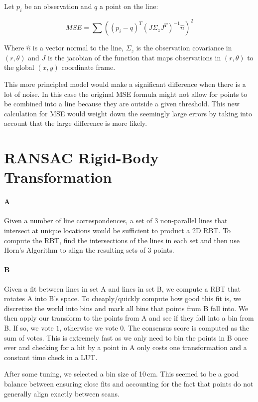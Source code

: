 \documentclass[12pt]{article}
\begin{document}
Let $p_i$ be an observation and $q$ a point on the line:

\[MSE = \sum{\left((p_i-q)^T\left(J\Sigma_zJ^T\right)^{-1}\hat{n}\right)^2} \]

Where $\hat{n}$ is a vector normal to the line, $\Sigma_z$ is the observation covariance in $(r,\theta)$ and $J$ is the jacobian of the function that maps observations in $(r,\theta)$ to the global $(x,y)$ coordinate frame.

This more principled model would make a significant difference when there is a lot of noise.  In this case the original MSE formula might not allow for points to be combined into a line because they are outside a given threshold.  This new calculation for MSE would weight down the seemingly large errors by taking into account that the large difference is more likely.
\section{RANSAC Rigid-Body Transformation}

\paragraph{A}
Given a number of line correspondences, a set of 3 non-parallel lines that
intersect at unique locations would be sufficient to product a 2D RBT. To
compute the RBT, find the intersections of the lines in each set and then
use Horn's Algorithm to align the resulting sets of 3 points.

\paragraph{B}
Given a fit between lines in set A and lines in set B, we compute a RBT that
rotates A into B's space. To cheaply/quickly compute how good this fit is,
we discretize the world into bins and mark all bins that points from B fall
into. We then apply our transform to the points from A and see if they fall
into a bin from B. If so, we vote $1$, otherwise we vote $0$. The consensus
score is computed as the sum of votes. This is extremely fast as we only need
to bin the points in B once ever and checking for a hit by a point in A only
costs one transformation and a constant time check in a LUT.

After some tuning, we selected a bin size of 10\,cm. This seemed to be a good
balance between ensuring close fits and accounting for the fact that points do
not generally align exactly between scans.
\end{document}
